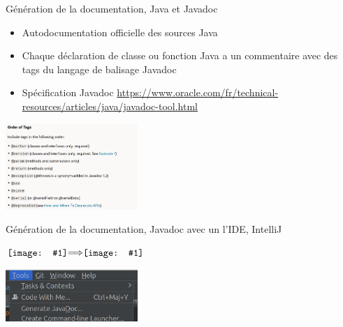 \documentclass{beamer}
\newcommand*{\vcenterimage}[1]{\vcenter{\hbox{\texttt{[image: \#1]}}}}
\newcommand*{\vcenterarrow}{\vcenter{\hbox{$\Longrightarrow$}}}
\begin{document}
    \begin{frame}{Génération de la documentation, Java et Javadoc}

        \begin{itemize}

            \item Autodocumentation officielle des sources Java
            \item Chaque déclaration de classe ou fonction Java a un commentaire avec des tags du langage de balisage Javadoc
            \item Spécification Javadoc \url{https://www.oracle.com/fr/technical-resources/articles/java/javadoc-tool.html}
        \end{itemize}
        \bigbreak

        \centering
        \includegraphics[width=5cm]{image/javadoc-tags}
    \end{frame}

    \begin{frame}{Génération de la documentation, Javadoc avec un l'IDE,  IntelliJ}

        \centering
        $\vcenterimage{image/javadoc-example}\vcenterarrow\vcenterimage{image/javadoc}$
        \bigbreak

        \includegraphics[width=5cm]{image/generate-button}

    \end{frame}
\end{document}
